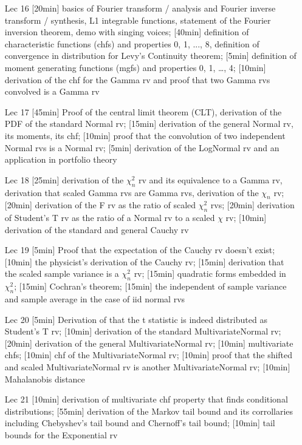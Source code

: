 \documentclass[12pt]{article}
\begin{document}
\begin{enumerate}
\item[Lec 16] [20min] basics of Fourier transform / analysis and Fourier inverse transform / synthesis, L1 integrable functions, statement of the Fourier inversion theorem, demo with singing voices; [40min] definition of characteristic functions (chfs) and properties 0, 1, ..., 8, definition of convergence in distribution for Levy's Continuity theorem; [5min] definition of moment generating functions (mgfs) and properties 0, 1, \ldots, 4; [10min] derivation of the chf for the Gamma rv and proof that two Gamma rvs convolved is a Gamma rv

\item[Lec 17] [45min] Proof of the central limit theorem (CLT), derivation of the PDF of the standard Normal rv; [15min] derivation of the general Normal rv, its moments, its chf; [10min] proof that the convolution of two independent Normal rvs is a Normal rv; [5min] derivation of the LogNormal rv and an application in portfolio theory

\item[Lec 18] [25min] derivation of the $\chi^2_n$ rv and its equivalence to a Gamma rv, derivation that scaled Gamma rvs are Gamma rvs, derivation of the $\chi_n$ rv; [20min] derivation of the F rv as the ratio of scaled $\chi^2_n$ rvs; [20min] derivation of Student's T rv as the ratio of a Normal rv to a scaled $\chi$ rv; [10min] derivation of the standard and general Cauchy rv

\item[Lec 19] [5min] Proof that the expectation of the Cauchy rv doesn't exist; [10min] the physicist's derivation of the Cauchy rv; [15min] derivation that the scaled sample variance is a $\chi^2_n$ rv; [15min] quadratic forms embedded in $\chi^2_n$; [15min] Cochran's theorem; [15min] the independent of sample variance and sample average in the case of iid normal rvs

\item[Lec 20] [5min] Derivation of that the t statistic is indeed distributed as Student's T rv; [10min] derivation of the standard MultivariateNormal rv; [20min] derivation of the general MultivariateNormal rv; [10min] multivariate chfs; [10min] chf of the MultivariateNormal rv; [10min] proof that the shifted and scaled MultivariateNormal rv is another MultivariateNormal rv; [10min] Mahalanobis distance

\item[Lec 21] [10min] derivation of multivariate chf property that finds conditional distributions; [55min] derivation of the Markov tail bound and its corrollaries including Chebyshev's tail bound and Chernoff's tail bound; [10min] tail bounds for the Exponential rv


\end{enumerate}
\end{document}
